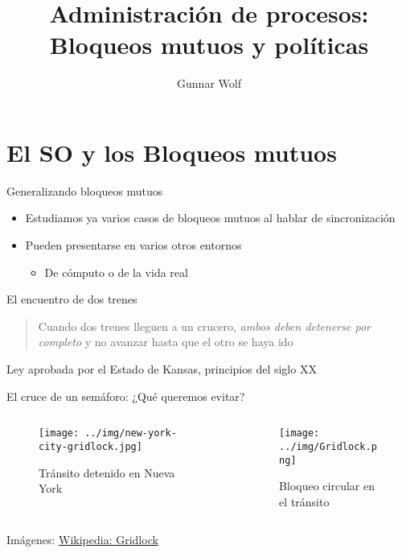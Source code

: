 \documentclass[presentation]{beamer}
\author{Gunnar Wolf}
\date{}
\title{Administración de procesos: Bloqueos mutuos y políticas}
\begin{document}
\maketitle

\section{El SO y los Bloqueos mutuos}
\label{sec:org7e6a745}
\begin{frame}[label={sec:org4554b30}]{Generalizando bloqueos mutuos}
\begin{itemize}
\item Estudiamos ya varios casos de bloqueos mutuos al hablar de
sincronización
\item Pueden presentarse en varios otros entornos
\begin{itemize}
\item De cómputo o de la vida real
\end{itemize}
\end{itemize}
\end{frame}

\begin{frame}[label={sec:org34103ea}]{El encuentro de dos trenes}
\begin{quote}
Cuando dos trenes lleguen a un crucero, \emph{ambos deben detenerse por
completo} y no avanzar hasta que el otro se haya ido
\end{quote}
\begin{center}
{\scriptsize Ley aprobada por el Estado de Kansas, principios del siglo XX}
\end{center}
\end{frame}

\begin{frame}[label={sec:orgb2ac606}]{El cruce de un semáforo: ¿Qué queremos evitar?}
\begin{columns} \begin{column}{0.5\textwidth}
\begin{figure}[htbp]
\centering
\texttt{[image: ../img/new-york-city-gridlock.jpg]}
\caption{Tránsito detenido en Nueva York}
\end{figure}
\end{column} \begin{column}{0.5\textwidth}
\begin{figure}[htbp]
\centering
\texttt{[image: ../img/Gridlock.png]}
\caption{Bloqueo circular en el tránsito}
\end{figure}
\end{column} \end{columns}
\begin{center}
Imágenes: \href{https://en.wikipedia.org/wiki/Gridlock}{Wikipedia: Gridlock}
\end{center}
\end{frame}
\end{document}
